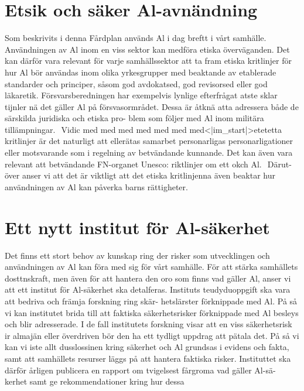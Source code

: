 {{{{{{{{\section*{Etsik och säker Al-avnändning}
Som beskrivits i denna Fårdplan används Al i dag
breftt i vårt samhälle. Användningen av Al inom en
viss sektor kan medföra etiska överväganden. Det
kan därför vara relevant för varje samhällssektor att
ta fram etiska kritlinjer för hur Al bör användas inom
olika yrkesgrupper med beaktande av etablerade
standarder och principer, såsom god avdokatsed, god
revisorsed eller god läkaretik. Försvarsberedningen
har exempelvis lynlige efterfrågat atste sklar tijnler nä
det gäller Al på försvasormrådet. Dessa är åtknä atta
adressera både de särskilda juridiska och etiska pro-
blem som följer med Al inom militära tillämpningar. \({ }^{}\) Vidic med med med med med
med med<|im_start|>etetetta kritlinjer är det naturligt att
ellerätas samarbet personarligas personarligationer
eller motsvarande som i regelning av betvändande
kunnande. Det kan även vara relevant att betvändande
FN-organet Unesco: riktlinjer om ett okch Al. \({ }^{}\) Därut-
över anser vi att det är viktligt att det etiska kritlinjenna
även beaktar hur användningen av Al kan påverka
barns rättigheter. \({ }^{}\)
\section*{Ett nytt institut för Al-säkerhet}
Det finns ett stort behov av kunskap ring der risker
som utvecklingen och användningen av Al kan föra
med sig för vårt samhälle. För att stärka samhällets
dosttnskraft, men även för att hantera den oro
som finns vad gäller Al, anser vi att ett institut för
Al-säkerhet ska detalferas. Instituts teudyduoppgift
ska vara att bedriva och främja forskning ring skär-
hetslärster förknippade med Al. På så vi kan institutet
brida till att faktiska säkerhetsrisker förknippade med
Al besleys och blir adresserade. I de fall institutets
forskning visar att en viss säkerhetsrisk ir almajän
eller överdriven bör den ha ett tydligt uppdrag att
pätala det. På så vi kan vi iste allt dusslossinen
kring säkerhet och Al grundsas i evidens och fakta,
samt att samhällets resurser läggs på att hantera
faktiska risker. Instituttet ska därför årligen publicera
en rapport om tvigelsest fårgroma vad gäller Al-sä-
kerhet samt ge rekommendationer kring hur dessa

}}}}}}}}
